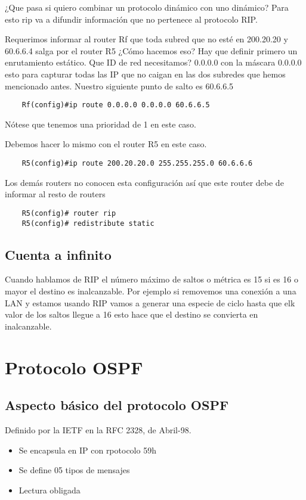 ¿Que pasa si quiero combinar un protocolo dinámico con uno dinámico? Para esto rip va a difundir información que no pertenece al protocolo RIP.

Requerimos informar al router Rf que toda subred que no esté en 200.20.20 y 60.6.6.4 salga por el router R5 ¿Cómo hacemos eso? Hay que definir primero un enrutamiento estático. Que ID de red necesitamos? 0.0.0.0 con la máscara 0.0.0.0 esto para capturar todas las IP que no caigan en las dos subredes que hemos mencionado antes. Nuestro siguiente punto de salto es 60.6.6.5
\begin{lstlisting}
    Rf(config)#ip route 0.0.0.0 0.0.0.0 60.6.6.5
\end{lstlisting}

Nótese que tenemos una prioridad de 1 en este caso. 

Debemos hacer lo mismo con el router R5 en este caso.

\begin{lstlisting}
    R5(config)#ip route 200.20.20.0 255.255.255.0 60.6.6.6
\end{lstlisting}

Los demás routers no conocen esta configuración así que este router debe de informar al resto de routers

\begin{lstlisting}
    R5(config)# router rip
    R5(config)# redistribute static
\end{lstlisting}

\section{Cuenta a infinito}
Cuando hablamos de RIP el número máximo de saltos o métrica es 15 si es 16 o mayor el destino es inalcanzable. Por ejemplo si removemos una conexión a una LAN y estamos usando RIP vamos a generar una especie de ciclo hasta que elk valor de los saltos llegue a 16 esto hace que el destino se convierta en inalcanzable.


\chapter{Protocolo OSPF}
\section{Aspecto básico del protocolo OSPF}
Definido por la IETF en la RFC 2328, de Abril-98.
\begin{itemize}
    \item {Se encapsula en IP con rpotocolo 59h}
    \item {Se define 05 tipos de mensajes}
    \item {Lectura obligada}
\end{itemize}

